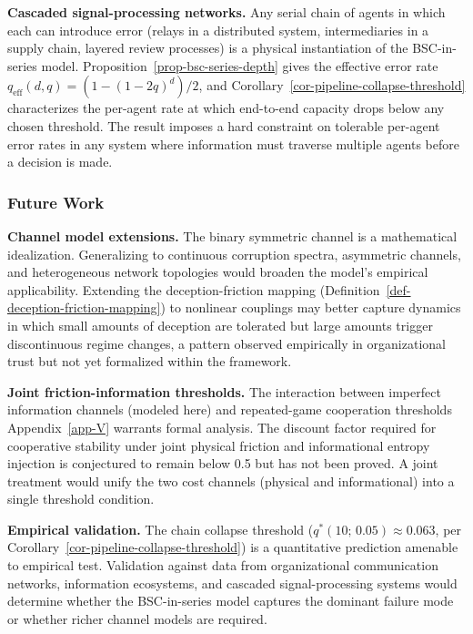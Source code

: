 \documentclass[11pt]{article}
\theoremstyle{plain}
\theoremstyle{definition}
\theoremstyle{remark}
\let\origsubsubsection\subsubsection
\renewcommand{\subsubsection}{\needspace{4\baselineskip}\origsubsubsection}
\begin{document}
\textbf{Cascaded signal-processing networks.} Any serial chain of agents
in which each can introduce error (relays in a distributed system,
intermediaries in a supply chain, layered review processes) is a
physical instantiation of the BSC-in-series model.
Proposition~\ref{prop-bsc-series-depth} gives the effective error rate
\(q_{\text{eff}}(d, q) = (1 - (1 - 2q)^d)/2\), and
Corollary~\ref{cor-pipeline-collapse-threshold} characterizes the
per-agent rate at which end-to-end capacity drops below any chosen
threshold. The result imposes a hard constraint on tolerable per-agent
error rates in any system where information must traverse multiple
agents before a decision is made.

\subsubsection{Future Work}\label{future-work-1}

\textbf{Channel model extensions.} The binary symmetric channel is a
mathematical idealization. Generalizing to continuous corruption
spectra, asymmetric channels, and heterogeneous network topologies would
broaden the model's empirical applicability. Extending the
deception-friction mapping
(Definition~\ref{def-deception-friction-mapping}) to nonlinear couplings
may better capture dynamics in which small amounts of deception are
tolerated but large amounts trigger discontinuous regime changes, a
pattern observed empirically in organizational trust but not yet
formalized within the framework.

\textbf{Joint friction-information thresholds.} The interaction between
imperfect information channels (modeled here) and repeated-game
cooperation thresholds Appendix~\ref{app-V} warrants formal analysis.
The discount factor required for cooperative stability under joint
physical friction and informational entropy injection is conjectured to
remain below 0.5 but has not been proved. A joint treatment would unify
the two cost channels (physical and informational) into a single
threshold condition.

\textbf{Empirical validation.} The chain collapse threshold
(\(q^*(10;\,0.05) \approx 0.063\), per
Corollary~\ref{cor-pipeline-collapse-threshold}) is a quantitative
prediction amenable to empirical test. Validation against data from
organizational communication networks, information ecosystems, and
cascaded signal-processing systems would determine whether the
BSC-in-series model captures the dominant failure mode or whether richer
channel models are required.
\end{document}
